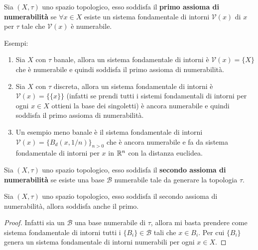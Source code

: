 \begin{definition}
	Sia $(X,\tau)$ uno spazio topologico, esso soddisfa il \textbf{primo assioma di numerabilità} se $\forall x \in X$ esiste un sistema fondamentale di intorni $\mathcal{V}(x)$ di $x$ per $\tau$ tale che $\mathcal{V}(x)$ è numerabile.
\end{definition}
Esempi:
\begin{enumerate}
	\item Sia $X$ con $\tau$ banale, allora un sistema fondamentale di intorni è $\mathcal{V}(x) = \{X\}$ che è numerabile e quindi soddisfa il primo assioma di numerabilità.
	\item Sia $X$ con $\tau$ discreta, allora un sistema fondamentale di intorni è $\mathcal{V}(x) = \{\{x\}\}$ (infatti se prendi tutti i sistemi fondamentali di intorni per ogni $x\in X$ ottieni la base dei singoletti) è ancora numerabile e quindi soddisfa il primo assioma di numerabilità.
	\item Un esempio meno banale è il sistema fondamentale di intorni $\mathcal{V}(x) = \{B_d(x, 1/n)\}_{n > 0}$ che è ancora numerabile e fa da sistema fondamentale di intorni per $x$ in $\mathbb{R}^n$ con la distanza euclidea.
\end{enumerate}

\begin{definition}
	Sia $(X,\tau)$ uno spazio topologico, esso soddisfa il \textbf{secondo assioma di numerabilità} se esiste una base $\mathcal{B}$ numerabile tale da generare la topologia $\tau$. 
\end{definition}

\begin{lemma}
	Sia $(X,\tau)$ uno spazio topologico, esso soddisfa il secondo assioma di numerabilità, allora soddisfa anche il primo. 
\end{lemma}
\begin{proof}
	Infatti sia un $\mathcal{B}$ una base numerabile di $\tau$, allora mi basta prendere come sistema fondamentale di intorni tutti i $\{B_i\} \in \mathcal{B}$ tali che $x \in B_i$. Per cui $\{B_i\}$ genera un sistema fondamentale di intorni numerabili per ogni $x \in X$.
\end{proof}

